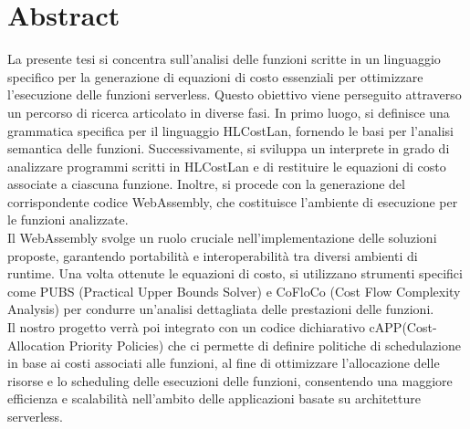 \documentclass[12pt,a4paper]{report}
\begin{document}


\pagestyle{headings} 

\clearpage

\chapter*{Abstract}
La presente tesi si concentra sull'analisi delle funzioni scritte in un linguaggio specifico per la generazione di equazioni di costo essenziali per ottimizzare l'esecuzione delle funzioni serverless. Questo obiettivo viene perseguito attraverso un percorso di ricerca articolato in diverse fasi. In primo luogo, si definisce una grammatica specifica per il linguaggio HLCostLan, fornendo le basi per l'analisi semantica delle funzioni. Successivamente, si sviluppa un interprete in grado di analizzare programmi scritti in HLCostLan e di restituire le equazioni di costo associate a ciascuna funzione. Inoltre, si procede con la generazione del corrispondente codice WebAssembly, che costituisce l'ambiente di esecuzione per le funzioni analizzate.\\
Il WebAssembly svolge un ruolo cruciale nell'implementazione delle soluzioni proposte, garantendo portabilità e interoperabilità tra diversi ambienti di runtime. Una volta ottenute le equazioni di costo, si utilizzano strumenti specifici come PUBS (Practical Upper Bounds Solver) e CoFloCo (Cost Flow Complexity Analysis) per condurre un'analisi dettagliata delle prestazioni delle funzioni.\\
Il nostro progetto verrà poi integrato con un codice dichiarativo cAPP(Cost-Allocation Priority Policies) che ci permette di definire politiche di schedulazione in base ai costi associati alle funzioni, al fine di ottimizzare l'allocazione delle risorse e lo scheduling delle esecuzioni delle funzioni, consentendo una maggiore efficienza e scalabilità nell'ambito delle applicazioni basate su architetture serverless.\\
\tableofcontents

\listoffigures

\renewcommand\lstlistlistingname{Indice di Codice}

\lstlistoflistings





 








\printbibliography[title={Bibliografia}, sorting=none]
\end{document}
